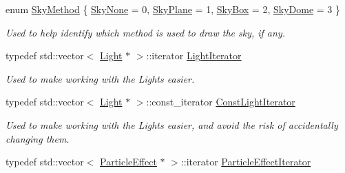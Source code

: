 \begin{DoxyCompactItemize}
enum \hyperlink{classphys_1_1SceneManager_a91dd086aabaab926d070c65fc14828d6}{SkyMethod} \{ \hyperlink{classphys_1_1SceneManager_a91dd086aabaab926d070c65fc14828d6a11aa0789aa0b39732c6968587b56e026}{SkyNone} =  0, 
\hyperlink{classphys_1_1SceneManager_a91dd086aabaab926d070c65fc14828d6af1251fd4f24ec8061fb585474635c10f}{SkyPlane} =  1, 
\hyperlink{classphys_1_1SceneManager_a91dd086aabaab926d070c65fc14828d6ac2ecb3ad06b3b545c27b7d70ca1b3a5a}{SkyBox} =  2, 
\hyperlink{classphys_1_1SceneManager_a91dd086aabaab926d070c65fc14828d6aa3c39672f84de2ae8ffb883e04af2edd}{SkyDome} =  3
 \}
\begin{DoxyCompactList}\small\item\em Used to help identify which method is used to draw the sky, if any. \item\end{DoxyCompactList}\item 
\hypertarget{classphys_1_1SceneManager_a2764b9082b4aecbf833c2f6e9f174ba0}{
typedef std::vector$<$ \hyperlink{classphys_1_1Light}{Light} $\ast$ $>$::iterator \hyperlink{classphys_1_1SceneManager_a2764b9082b4aecbf833c2f6e9f174ba0}{LightIterator}}
\label{classphys_1_1SceneManager_a2764b9082b4aecbf833c2f6e9f174ba0}

\begin{DoxyCompactList}\small\item\em Used to make working with the Lights easier. \item\end{DoxyCompactList}\item 
\hypertarget{classphys_1_1SceneManager_a417c57b560317661d0c7d836a88f52ac}{
typedef std::vector$<$ \hyperlink{classphys_1_1Light}{Light} $\ast$ $>$::const\_\-iterator \hyperlink{classphys_1_1SceneManager_a417c57b560317661d0c7d836a88f52ac}{ConstLightIterator}}
\label{classphys_1_1SceneManager_a417c57b560317661d0c7d836a88f52ac}

\begin{DoxyCompactList}\small\item\em Used to make working with the Lights easier, and avoid the risk of accidentally changing them. \item\end{DoxyCompactList}\item 
\hypertarget{classphys_1_1SceneManager_a668ef8db2053cc15cc48b21fa6240c3e}{
typedef std::vector$<$ \hyperlink{classphys_1_1ParticleEffect}{ParticleEffect} $\ast$ $>$::iterator \hyperlink{classphys_1_1SceneManager_a668ef8db2053cc15cc48b21fa6240c3e}{ParticleEffectIterator}}
\label{classphys_1_1SceneManager_a668ef8db2053cc15cc48b21fa6240c3e}


\end{DoxyCompactItemize}
